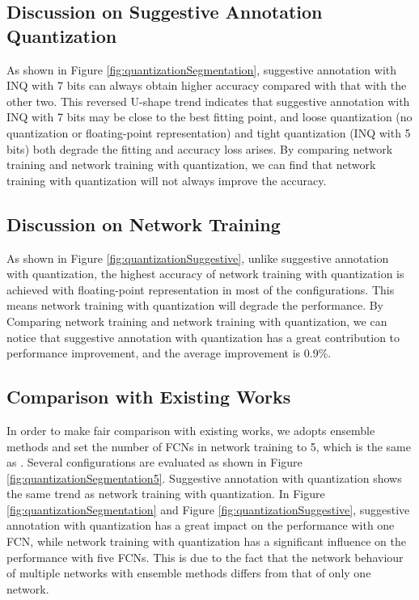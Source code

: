 \documentclass[10pt,twocolumn,letterpaper]{article}
\begin{document}
\vspace{6pt}
\subsection{Discussion on Suggestive Annotation Quantization}

As shown in Figure \ref{fig:quantizationSegmentation}, suggestive annotation with INQ with 7 bits can always obtain higher accuracy compared with that with the other two.
This reversed U-shape trend indicates that suggestive annotation with INQ with 7 bits may be close to the best fitting point, and loose quantization (no quantization or floating-point representation) and tight quantization (INQ with 5 bits) both degrade the fitting and accuracy loss arises.
By comparing network training and network training with quantization, we can find that network training with quantization will not always improve the accuracy.


\vspace{6pt}
\subsection{Discussion on Network Training}

As shown in Figure \ref{fig:quantizationSuggestive}, unlike suggestive annotation with quantization, the highest accuracy of network training with quantization is achieved with floating-point representation in most of the configurations.
This means network training with quantization will degrade the performance.
By Comparing network training and network training with quantization, we can notice that suggestive annotation with quantization has a great contribution to performance improvement, and the average improvement is 0.9\%.



\vspace{6pt}
\subsection{Comparison with Existing Works}

In order to make fair comparison with existing works, we adopts ensemble methods and set the number of FCNs in network training to 5, which is the same as \cite{yang2017suggestive}.
Several configurations are evaluated as shown in Figure \ref{fig:quantizationSegmentation5}.
Suggestive annotation with quantization shows the same trend as network training with quantization.
In Figure \ref{fig:quantizationSegmentation} and Figure \ref{fig:quantizationSuggestive}, suggestive annotation with quantization has a great impact on the performance with one FCN, while network training with quantization has a significant influence on the performance with five FCNs.
This is due to the fact that the network behaviour of multiple networks with ensemble methods differs from that of only one network.
\end{document}
